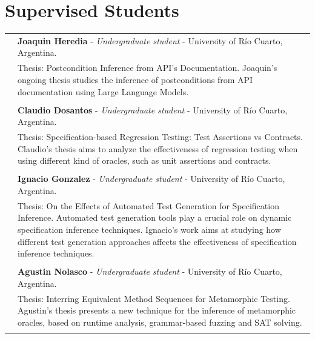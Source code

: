 \documentclass[a4paper,10pt]{article} %
\begin{document}


\section{Supervised Students}

\begin{longtable}{>{\raggedleft\arraybackslash}p{} p{}}

2026 & \textbf{Joaquin Heredia} - \textit{Undergraduate student} - University of Río Cuarto, Argentina. \\
& Thesis: Postcondition Inference from API's Documentation. Joaquin's ongoing thesis studies the inference of postconditions from API documentation using Large Language Models. \\ & \\

2025 & \textbf{Claudio Dosantos} - \textit{Undergraduate student} - University of Río Cuarto, Argentina. \\
& Thesis: Specification-based Regression Testing: Test Assertions vs Contracts. Claudio's thesis aims to analyze the effectiveness of regression testing when using different kind of oracles, such as unit assertions and contracts. \\ & \\

2024 & \textbf{Ignacio Gonzalez} - \textit{Undergraduate student} - University of Río Cuarto, Argentina. \\
& Thesis: On the Effects of Automated Test Generation for Specification Inference. Automated test generation tools play a crucial role on dynamic specification inference techniques. Ignacio's work aims at studying how different test generation approaches affects the effectiveness of specification inference techniques. \\ & \\

2023 & \textbf{Agustin Nolasco} - \textit{Undergraduate student} - University of Río Cuarto, Argentina. \\ 
& Thesis: Interring Equivalent Method Sequences for Metamorphic Testing. Agustin's thesis presents a new technique for the inference of metamorphic oracles, based on runtime analysis, grammar-based fuzzing and SAT solving. \\ & \\

\end{longtable}
\end{document}
